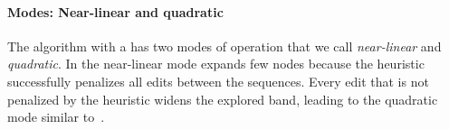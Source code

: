 \paragraph{Modes: Near-linear and quadratic}

The \A algorithm with a \sh has two modes of operation that we call
\emph{near-linear} and \emph{quadratic}. In the near-linear mode \astarpa expands few
nodes because the heuristic successfully penalizes all edits
between the sequences. Every edit that is not penalized by the heuristic widens
the explored band, leading to the quadratic mode similar to~\dijkstra.
